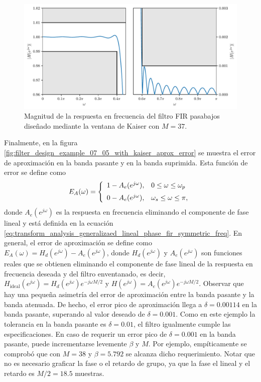 \documentclass[a4paper]{report}
\begin{document}
\begin{figure}[!htb]
 \begin{center}
 \includegraphics[width=1\textwidth]{figuras/filter_design_example_07_05_with_kaiser_zoom.pdf}
 \caption{\label{fig:filter_design_example_07_05_with_kaiser_zoom} Magnitud de la respuesta en frecuencia del filtro FIR pasabajos diseñado mediante la ventana de Kaiser con \(M=37\).}
 \end{center}
\end{figure}
Finalmente, en la figura \ref{fig:filter_design_example_07_05_with_kaiser_aprox_error} se muestra el error de aproximación en la banda pasante y en la banda suprimida. Esta función de error se define como
\begin{equation}\label{eq:filter_design_windowing_approximation_error_low_pass}
 E_A(\omega)=
 \left\{ 
 \begin{array}{ll}
  1-A_e(e^{j\omega}), & 0\leq\omega\leq\omega_p \\[\medskipamount]
  0-A_e(e^{j\omega}), & \omega_s\leq\omega\leq\pi,
 \end{array}
 \right. 
\end{equation}
donde \(A_e(e^{j\omega})\) es la respuesta en frecuencia eliminando el componente de fase lineal y está definida en la ecuación \ref{eq:transform_analysis_generalizaed_lineal_phase_fir_symmetric_freq}. En general, el error de aproximación se define como \(E_A(\omega)=H_d(e^{j\omega})-A_e(e^{j\omega})\), donde \(H_d(e^{j\omega})\) y \(A_e(e^{j\omega})\) son funciones reales que se obtienen eliminando el componente de fase lineal de la respuesta en frecuencia deseada y del filtro enventanado, es decir, \(H_\textrm{ideal}(e^{j\omega})=H_d(e^{j\omega})e^{-j\omega M/2}\) y \(H(e^{j\omega})=A_e(e^{j\omega})e^{-j\omega M/2}\). Observar que hay una pequeña asimetría del error de aproximación entre la banda pasante y la banda atenuada. De hecho, el error pico de aproximación llega a \(\delta=0.00114\) en la banda pasante, superando al valor deseado de \(\delta=0.001\). Como en este ejemplo la tolerancia en la banda pasante es \(\delta=0.01\), el filtro igualmente cumple las especificaciones. En caso de requerir un error pico de \(\delta=0.001\) en la banda pasante, puede incrementarse levemente \(\beta\) y \(M\). Por ejemplo, empíticamente se comprobó que con \(M=38\) y \(\beta=5.792\) se alcanza dicho requerimiento. Notar que no es necesario graficar la fase o el retardo de grupo, ya que la fase el lineal y el retardo es \(M/2=18.5\) muestras.
\end{document}
